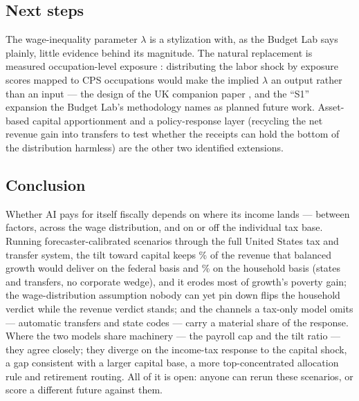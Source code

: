 \subsection{Next steps}

The wage-inequality parameter $\lambda$ is a stylization with, as the Budget
Lab says plainly, little evidence behind its magnitude. The natural
replacement is measured occupation-level exposure
\citep{felten2021, eloundou2024}: distributing the labor shock by exposure
scores mapped to CPS occupations would make the implied $\lambda$ an output
rather than an input --- the design of the UK companion paper
\citep{ahmadi2026}, and the ``S1'' expansion the Budget Lab's methodology
names as planned future work. Asset-based capital apportionment and a
policy-response layer (recycling the net revenue gain into transfers to test
whether the receipts can hold the bottom of the distribution harmless) are
the other two identified extensions.

\subsection{Conclusion}

Whether AI pays for itself fiscally depends on where its income lands ---
between factors, across the wage distribution, and on or off the individual
tax base. Running forecaster-calibrated scenarios through the full United
States tax and transfer system, the tilt toward capital keeps
\genKeptMatchedRapidPct\% of the revenue that balanced growth would deliver
on the federal basis and \genKeptHouseholdRapidPct\% on the household basis
(states and transfers, no corporate wedge), and it erodes most of growth's
poverty gain; the wage-distribution assumption nobody can yet
pin down flips the household verdict while the revenue verdict stands; and
the channels a tax-only model omits --- automatic transfers and state codes
--- carry a material share of the response. Where the two models share
machinery --- the payroll cap and the tilt ratio --- they agree closely; they
diverge on the income-tax response to the capital shock, a gap consistent with
a larger capital base, a more top-concentrated allocation rule and retirement
routing. All of it is open:
anyone can rerun these scenarios, or score a different future against them.
